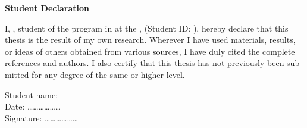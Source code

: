 \ChapterStart
\begin{latin}
\thispagestyle{empty}
\begin{center}
  {\Large\bfseries Student Declaration}
\end{center}
\vspace{1.2em}

\noindent
I, \textbf{\StudentNameEN}, student of the \StudentDegreeEN{} program in
\StudentFieldEN{} at the \FacultyEN{}, \UniversityEN{} (Student ID:
\lr{\StudentID}), hereby declare that this thesis is the result of my own
research. Wherever I have used materials, results, or ideas of others obtained
from various sources, I have duly cited the complete references and authors.
I also certify that this thesis has not previously been submitted for any
degree of the same or higher level.

\vspace{2em}
\begin{flushleft}
  Student name: \StudentNameEN\\[1em]
  Date: \ldots\ldots\ldots\ldots\ldots\ldots\\[1em]
  Signature: \ldots\ldots\ldots\ldots\ldots\ldots
\end{flushleft}
\end{latin}
\clearpage
